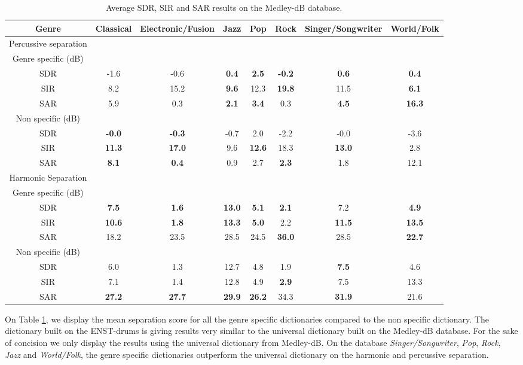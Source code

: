 \documentclass{article}
\begin{document}
\begin{table}
   
\begin{tabular}{|c|c|c|c|c|c|c|c|}
\hline   
Genre & Classical & Electronic/Fusion & Jazz & Pop & Rock & Singer/Songwriter & World/Folk \\
\hline
Percussive separation & & & & & & & \\
\hline
Genre specific (dB)  & & & & & & & \\
SDR & -1.6     & -0.6     &\bf{0.4} & \bf{2.5}&\bf{-0.2}& \bf{0.6} & \bf{0.4} \\
SIR & 8.2      & 15.2     &\bf{9.6} & 12.3    &\bf{19.8}& 11.5     & \bf{6.1} \\
SAR & 5.9      & 0.3      &\bf{2.1} & \bf{3.4}& 0.3    & \bf{4.5} & \bf{16.3} \\
\hline
Non specific (dB) & & & & & & &\\
SDR & \bf{-0.0}& \bf{-0.3}& -0.7    & 2.0     & -2.2    & -0.0     & -3.6 \\
SIR & \bf{11.3} & \bf{17.0}& 9.6     &\bf{12.6}& 18.3    & \bf{13.0}& 2.8 \\
SAR & \bf{8.1} & \bf{0.4} & 0.9     & 2.7     &\bf{2.3} & 1.8      & 12.1 \\
\hline   
Harmonic Separation &  & & & & & & \\  
\hline
Genre specific (dB)  & & & & & & & \\
SDR & \bf{7.5}    & \bf{1.6}    & \bf{13.0} & \bf{5.1}  & \bf{2.1}& 7.2      &\bf{4.9} \\
SIR & \bf{10.6}   & \bf{1.8}    & \bf{13.3} & \bf{5.0 } & 2.2     & \bf{11.5}& \bf{13.5} \\
SAR & 18.2       & 23.5       & 28.5      & 24.5      &\bf{36.0}& 28.5     & \bf{22.7} \\
\hline
Non specific (dB) & & & & & & &\\
SDR & 6.0        & 1.3       & 12.7     & 4.8      & 1.9      & \bf{7.5}      & 4.6\\
SIR & 7.1       & 1.4        & 12.8     & 4.9      & \bf{2.9} & 7.5      & 13.3 \\
SAR & \bf{27.2}& \bf{27.7}   & \bf{29.9} & \bf{26.2}& 34.3     &\bf{31.9} & 21.6\\
\hline
  \end{tabular} 
\caption{\label{specresults} Average SDR, SIR and SAR results on the Medley-dB database.}
\end{table}



On Table \ref{specresults}, we display the mean separation score for all the genre specific dictionaries compared to the non specific dictionary. The dictionary built on the ENST-drums is giving results very similar to the universal dictionary built on the Medley-dB database. For the sake of concision we only display the results using the universal dictionary from Medley-dB. On the database \emph{Singer/Songwriter}, \emph{Pop}, \emph{Rock}, \emph{Jazz} and \emph{World/Folk}, the genre specific dictionaries outperform the universal dictionary on the harmonic and percussive separation.
\end{document}
